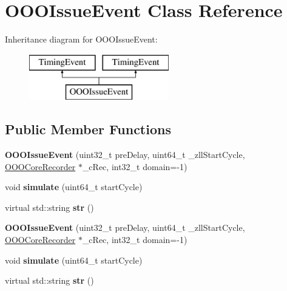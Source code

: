 \hypertarget{classOOOIssueEvent}{\section{O\-O\-O\-Issue\-Event Class Reference}
\label{classOOOIssueEvent}
}
Inheritance diagram for O\-O\-O\-Issue\-Event\-:\begin{figure}[H]
\begin{center}
\leavevmode
\includegraphics[height=2.000000cm]{classOOOIssueEvent}
\end{center}
\end{figure}
\subsection*{Public Member Functions}
\begin{DoxyCompactItemize}
\item 
\hypertarget{classOOOIssueEvent_a84a21a967f11f5597e51baf2c6fa5378}{{\bfseries O\-O\-O\-Issue\-Event} (uint32\-\_\-t pre\-Delay, uint64\-\_\-t \-\_\-zll\-Start\-Cycle, \hyperlink{classOOOCoreRecorder}{O\-O\-O\-Core\-Recorder} $\ast$\-\_\-c\-Rec, int32\-\_\-t domain=-\/1)}\label{classOOOIssueEvent_a84a21a967f11f5597e51baf2c6fa5378}

\item 
\hypertarget{classOOOIssueEvent_aaf602985eb940dae0378d1ab57357dd4}{void {\bfseries simulate} (uint64\-\_\-t start\-Cycle)}\label{classOOOIssueEvent_aaf602985eb940dae0378d1ab57357dd4}

\item 
\hypertarget{classOOOIssueEvent_ad6d4b5c5c3be90206a750dec334b4467}{virtual std\-::string {\bfseries str} ()}\label{classOOOIssueEvent_ad6d4b5c5c3be90206a750dec334b4467}

\item 
\hypertarget{classOOOIssueEvent_a84a21a967f11f5597e51baf2c6fa5378}{{\bfseries O\-O\-O\-Issue\-Event} (uint32\-\_\-t pre\-Delay, uint64\-\_\-t \-\_\-zll\-Start\-Cycle, \hyperlink{classOOOCoreRecorder}{O\-O\-O\-Core\-Recorder} $\ast$\-\_\-c\-Rec, int32\-\_\-t domain=-\/1)}\label{classOOOIssueEvent_a84a21a967f11f5597e51baf2c6fa5378}

\item 
\hypertarget{classOOOIssueEvent_aaf602985eb940dae0378d1ab57357dd4}{void {\bfseries simulate} (uint64\-\_\-t start\-Cycle)}\label{classOOOIssueEvent_aaf602985eb940dae0378d1ab57357dd4}

\item 
\hypertarget{classOOOIssueEvent_ad6d4b5c5c3be90206a750dec334b4467}{virtual std\-::string {\bfseries str} ()}\label{classOOOIssueEvent_ad6d4b5c5c3be90206a750dec334b4467}

\end{DoxyCompactItemize}
